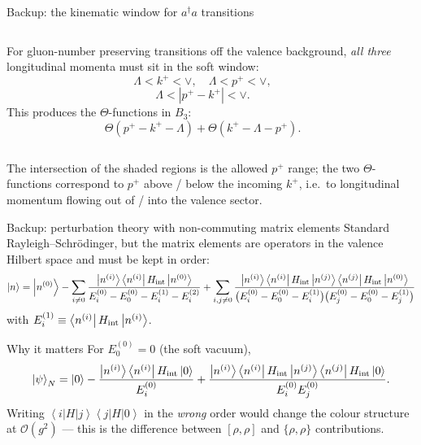 \documentclass[9pt,aspectratio=169]{beamer}
\newcommand{\hl}[1]{\textcolor{acc}{#1}}
\newcommand{\pp}{p^{+}}
\newcommand{\kp}{k^{+}}
\newcommand{\ket}[1]{\left|#1\right\rangle}
\newcommand{\bra}[1]{\left\langle#1\right|}
\newcommand{\ad}{a^{\dagger}}
\begin{document}
\begin{frame}{Backup: the kinematic window for $\ad a$ transitions}
\begin{columns}[T,onlytextwidth]
For gluon-number preserving transitions off the valence background, \emph{all three}
longitudinal momenta must sit in the soft window:
\[
\Lambda<\kp<\vee,\quad \Lambda<\pp<\vee,
\]
\[
\Lambda<|\pp-\kp|<\vee .
\]
This produces the $\Theta$-functions in $B_{3}$:
\[
\Theta(\pp-\kp-\Lambda)+\Theta(\kp-\Lambda-\pp).
\]
\vspace{-8pt}
\begin{center}
\end{center}
\end{columns}
\vspace{-2pt}
{\small The intersection of the shaded regions is the allowed $\pp$ range; the two
$\Theta$-functions correspond to $\pp$ above / below the incoming $\kp$, i.e.\ to longitudinal
momentum flowing out of / into the valence sector.}
\end{frame}

\begin{frame}{Backup: perturbation theory with non-commuting matrix elements}
Standard Rayleigh--Schr\"odinger, but the matrix elements are \hl{operators in the valence
Hilbert space} and must be kept in order:
\[
\ket{n}=\ket{n^{(0)}}-\sum_{i\neq0}\frac{\ket{n^{(i)}}\bra{n^{(i)}}H_{\rm int}\ket{n^{(0)}}}
{E^{(0)}_{i}-E^{(0)}_{0}-E^{(1)}_{i}-E^{(2)}_{i}}
+\sum_{i,j\neq0}\frac{\ket{n^{(i)}}\bra{n^{(i)}}H_{\rm int}\ket{n^{(j)}}\bra{n^{(j)}}H_{\rm int}\ket{n^{(0)}}}
{\big(E^{(0)}_{i}-E^{(0)}_{0}-E^{(1)}_{i}\big)\big(E^{(0)}_{j}-E^{(0)}_{0}-E^{(1)}_{j}\big)}
\]
with $E^{(1)}_{i}\equiv\bra{n^{(i)}}H_{\rm int}\ket{n^{(i)}}$.
\medskip
\begin{block}{Why it matters}
For $E_{0}^{(0)}=0$ (the soft vacuum),
\[
\ket{\psi}_{N}=\ket0-\frac{\ket{n^{(i)}}\bra{n^{(i)}}H_{\rm int}\ket{0}}{E^{(0)}_{i}}
+\frac{\ket{n^{(i)}}\bra{n^{(i)}}H_{\rm int}\ket{n^{(j)}}\bra{n^{(j)}}H_{\rm int}\ket{0}}{E^{(0)}_{i}E^{(0)}_{j}} .
\]
Writing $\bra{i}H\ket{j}\bra{j}H\ket{0}$ in the \emph{wrong} order would change the
colour structure at $\mathcal{O}(g^{2})$ --- this is the difference between
$[\rho,\rho]$ and $\{\rho,\rho\}$ contributions.
\end{block}
\end{frame}
\end{document}
